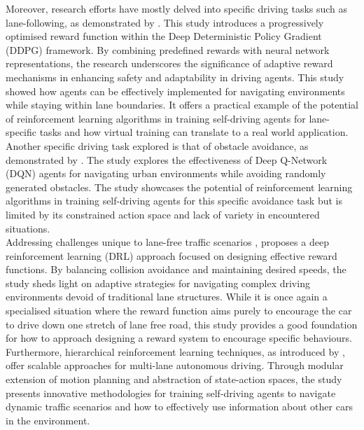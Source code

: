 \documentclass{article}
\begin{document}
Moreover, research efforts have mostly delved into specific driving tasks such as lane-following, as demonstrated by \cite{personalized_autonomous_driving}. This study introduces a progressively optimised reward function within the Deep Deterministic Policy Gradient (DDPG) framework. By combining predefined rewards with neural network representations, the research underscores the significance of adaptive reward mechanisms in enhancing safety and adaptability in driving agents. This study showed how agents can be effectively implemented for navigating environments while staying within lane boundaries. It offers a practical example of the potential of reinforcement learning algorithms in training self-driving agents for lane-specific tasks and how virtual training can translate to a real world application. \\

Another specific driving task explored is that of obstacle avoidance, as demonstrated by \cite{autonomous_driving_deep_q_learning}. The study explores the effectiveness of Deep Q-Network (DQN) agents for navigating urban environments while avoiding randomly generated obstacles. The study showcases the potential of reinforcement learning algorithms in training self-driving agents for this specific avoidance task but is limited by its constrained action space and lack of variety in encountered situations. \\

Addressing challenges unique to lane-free traffic scenarios \cite{reward_function_lane_free_driving}, proposes a deep reinforcement learning (DRL) approach focused on designing effective reward functions. By balancing collision avoidance and maintaining desired speeds, the study sheds light on adaptive strategies for navigating complex driving environments devoid of traditional lane structures. While it is once again a specialised situation where the reward function aims purely to encourage the car to drive down one stretch of lane free road, this study provides a good foundation for how to approach designing a reward system to encourage specific behaviours. \\

Furthermore, hierarchical reinforcement learning techniques, as introduced by \cite{hierarchical_rl_multi_lane_driving}, offer scalable approaches for multi-lane autonomous driving. Through modular extension of motion planning and abstraction of state-action spaces, the study presents innovative methodologies for training self-driving agents to navigate dynamic traffic scenarios and how to effectively use information about other cars in the environment. \\
\end{document}
